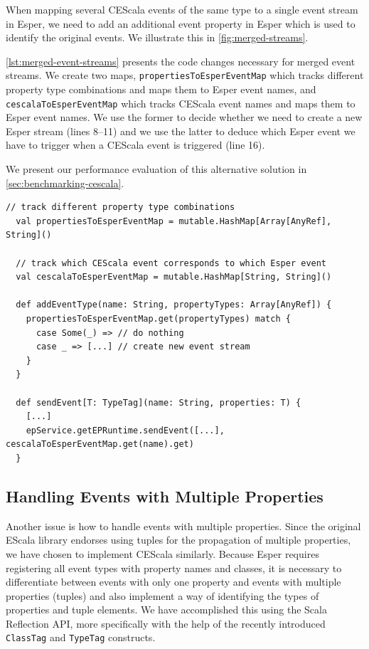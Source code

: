 \documentclass[book,type=bsc,colorback,accentcolor=tud8b,12pt,twoside]{tudthesis}
\begin{document}
When mapping several CEScala events of the same type to a single event stream in Esper, we need to add an additional event property in Esper which is used to identify the original events.  We illustrate this in \autoref{fig:merged-streams}.  

\autoref{lst:merged-event-streams} presents the code changes necessary for merged event streams.  We create two maps, \mbox{\texttt{propertiesToEsperEventMap}} which tracks different property type combinations and maps them to Esper event names, and \mbox{\texttt{cescalaToEsperEventMap}} which tracks CEScala event names and maps them to Esper event names.  We use the former to decide whether we need to create a new Esper stream (lines 8--11) and we use the latter to deduce which Esper event we have to trigger when a CEScala event is triggered (line 16).  

We present our performance evaluation of this alternative solution in \autoref{sec:benchmarking-cescala}.  

\begin{lstlisting}[caption=Merged event streams,label=lst:merged-event-streams,float=tp]
  // track different property type combinations
  val propertiesToEsperEventMap = mutable.HashMap[Array[AnyRef], String]()

  // track which CEScala event corresponds to which Esper event
  val cescalaToEsperEventMap = mutable.HashMap[String, String]()

  def addEventType(name: String, propertyTypes: Array[AnyRef]) {
    propertiesToEsperEventMap.get(propertyTypes) match {
      case Some(_) => // do nothing
      case _ => [...] // create new event stream
    }
  }

  def sendEvent[T: TypeTag](name: String, properties: T) {
    [...]
    epService.getEPRuntime.sendEvent([...], cescalaToEsperEventMap.get(name).get)
  }
\end{lstlisting}

\subsection{Handling Events with Multiple Properties}
\label{sec:events-multiple-properties}

Another issue is how to handle events with multiple properties.  Since the original EScala library endorses using tuples for the propagation of multiple properties, we have chosen to implement CEScala similarly.  Because Esper requires registering all event types with property names and classes, it is necessary to differentiate between events with only one property and events with multiple properties (tuples) and also implement a way of identifying the types of properties and tuple elements.  We have accomplished this using the Scala Reflection API, more specifically with the help of the recently introduced \mbox{\texttt{ClassTag}} and \mbox{\texttt{TypeTag}} constructs.
\end{document}
